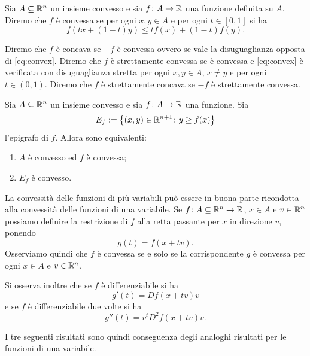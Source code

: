 \begin{definition}
Sia $A\subseteq {\mathbb R}^n$ un insieme convesso e sia $f\colon A \to {\mathbb R}$ una funzione definita su $A$.
Diremo che $f$ è convessa se per ogni $x,y \in A$ e per ogni $t \in [0,1]$ si ha
\begin{equation}\label{eq:convex}
    f(t x + (1-t) y) \leq t f(x) + (1-t) f(y).
\end{equation}

Diremo che $f$ è concava se $-f$ è convessa ovvero se vale la disuguaglianza 
opposta di \eqref{eq:convex}.
Diremo che $f$ è strettamente convessa se è convessa 
e \eqref{eq:convex} è verificata con disuguaglianza stretta per ogni $x,y \in A$, 
$x\neq y$ e per ogni $t \in (0,1)$.
Diremo che $f$ è strettamente concava se $-f$ è strettamente convessa.
\end{definition}

\begin{theorem}
Sia $A\subseteq {\mathbb R}^n$ un insieme convesso e sia $f\colon A \to {\mathbb R}$ una funzione.
Sia 
\[
  E_f := {\left\{ (x,y)\in {\mathbb R}^{n+1}\colon y\ge f(x) \right\}}
\]
l'epigrafo di $f$.
Allora sono equivalenti:
\begin{enumerate}
    \item $A$ è convesso ed $f$ è convessa;
    \item $E_f$ è convesso.
\end{enumerate}
\end{theorem}

La convessità delle funzioni di più variabili può essere in buona parte 
ricondotta alla convessità delle funzioni di una variabile. 
Se $f\colon A\subseteq {\mathbb R}^n \to {\mathbb R}$, $x\in A$ e $v\in {\mathbb R}^n$ 
possiamo definire la restrizione di $f$ alla retta passante per $x$ 
in direzione $v$, ponendo
\[
  g(t) = f(x+t v).
\]
Osserviamo quindi che $f$ è convessa se e solo se la corrispondente 
$g$ è convessa per ogni $x\in A$ e $v\in {\mathbb R}^n$.

Si osserva inoltre che se $f$ è differenziabile si ha 
\[
  g'(t) = Df(x+t v)v
\]
e se $f$ è differenziabile due volte si ha
\[
  g''(t) = v^t D^2 f(x+t v) v.
\]

I tre seguenti risultati sono quindi conseguenza 
degli analoghi risultati per le funzioni di una variabile.

